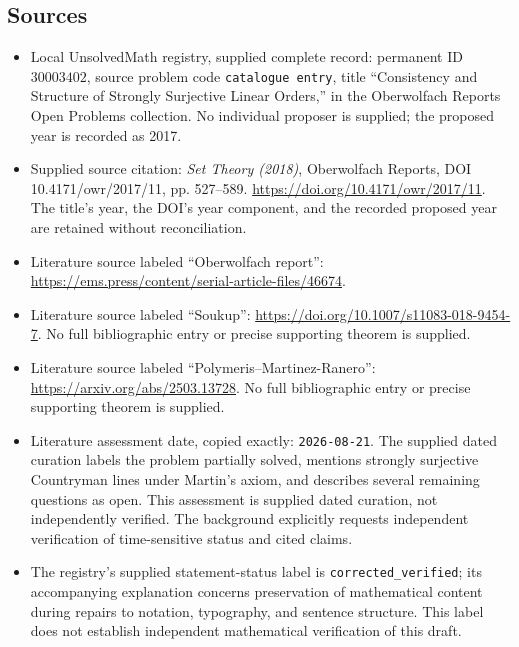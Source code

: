 \documentclass[11pt]{article}
\begin{document}
\subsection{Sources}
\begin{itemize}
\item Local UnsolvedMath registry, supplied complete record: permanent ID \(30003402\), source problem code \texttt{catalogue entry}, title ``Consistency and Structure of Strongly Surjective Linear Orders,'' in the Oberwolfach Reports Open Problems collection. No individual proposer is supplied; the proposed year is recorded as 2017.
\item Supplied source citation: \emph{Set Theory (2018)}, Oberwolfach Reports, DOI 10.4171/owr/2017/11, pp. 527--589. \url{https://doi.org/10.4171/owr/2017/11}. The title's year, the DOI's year component, and the recorded proposed year are retained without reconciliation.
\item Literature source labeled ``Oberwolfach report'': \url{https://ems.press/content/serial-article-files/46674}.
\item Literature source labeled ``Soukup'': \url{https://doi.org/10.1007/s11083-018-9454-7}. No full bibliographic entry or precise supporting theorem is supplied.
\item Literature source labeled ``Polymeris--Martinez-Ranero'': \url{https://arxiv.org/abs/2503.13728}. No full bibliographic entry or precise supporting theorem is supplied.
\item Literature assessment date, copied exactly: \texttt{2026-08-21}. The supplied dated curation labels the problem partially solved, mentions strongly surjective Countryman lines under Martin's axiom, and describes several remaining questions as open. This assessment is supplied dated curation, not independently verified. The background explicitly requests independent verification of time-sensitive status and cited claims.
\item The registry's supplied statement-status label is \texttt{corrected\_verified}; its accompanying explanation concerns preservation of mathematical content during repairs to notation, typography, and sentence structure. This label does not establish independent mathematical verification of this draft.
\end{itemize}
\end{document}
